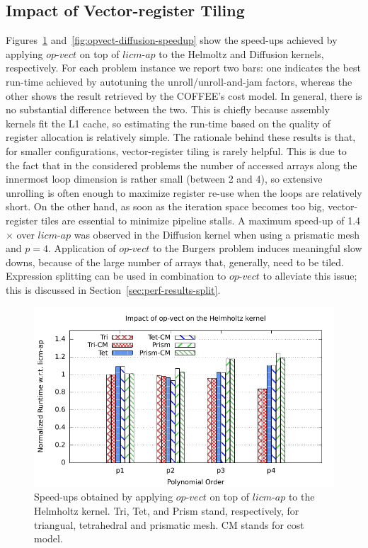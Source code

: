 \documentclass[conference]{IEEEtran}
\begin{document}
\subsection{Impact of Vector-register Tiling}
Figures~\ref{fig:opvect-helmholtz-speedup} and~\ref{fig:opvect-diffusion-speedup} show the speed-ups achieved by applying $op$-$vect$ on top of $licm$-$ap$ to the Helmoltz and Diffusion kernels, respectively. For each problem instance we report two bars: one indicates the best run-time achieved by autotuning the unroll/unroll-and-jam factors, whereas the other shows the result retrieved by the COFFEE's cost model. In general, there is no substantial difference between the two. This is chiefly because assembly kernels fit the L1 cache, so estimating the run-time based on the quality of register allocation is relatively simple. The rationale behind these results is that, for smaller configurations, vector-register tiling is rarely helpful. This is due to the fact that in the considered problems the number of accessed arrays along the innermost loop dimension is rather small (between 2 and 4), so extensive unrolling is often enough to maximize register re-use when the loops are relatively short. On the other hand, as soon as the iteration space becomes too big, vector-register tiles are essential to minimize pipeline stalls. A maximum speed-up of 1.4$\times$ over $licm$-$ap$ was observed in the Diffusion kernel when using a prismatic mesh and $p=4$. Application of $op$-$vect$ to the Burgers problem induces meaningful slow downs, because of the large number of arrays that, generally, need to be tiled. Expression splitting can be used in combination to $op$-$vect$ to alleviate this issue; this is discussed in Section~\ref{sec:perf-results-split}.

\begin{figure}[h]
\includegraphics[scale=0.7]{Pictures/helmholtz-normalized-opvect.pdf}
\caption{Speed-ups obtained by applying $op$-$vect$ on top of $licm$-$ap$ to the Helmholtz kernel. Tri, Tet, and Prism stand, respectively, for triangual, tetrahedral and prismatic mesh. CM stands for cost model.}
\label{fig:opvect-helmholtz-speedup}
\end{figure}
\end{document}
